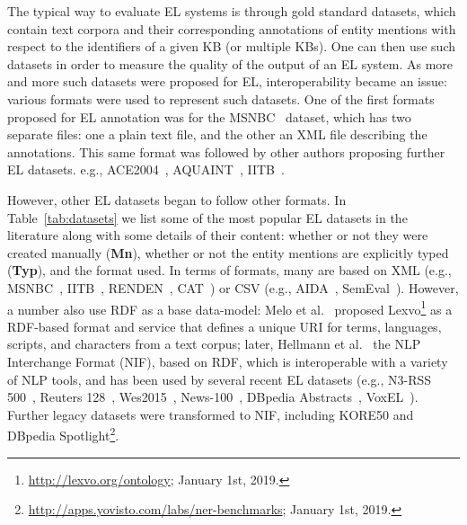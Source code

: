 \documentclass[sigconf]{acmart}
\begin{document}
The typical way to evaluate EL systems is through gold standard datasets, which contain text corpora and their corresponding annotations of entity mentions with respect to the identifiers of a given KB (or multiple KBs). One can then use such datasets in order to measure the quality of the output of an EL system. As more and more such datasets were proposed for EL, interoperability became an issue: various formats were used to represent such datasets. One of the first formats proposed for EL annotation was for the MSNBC~\cite{cucerzan2007large} dataset, which has two separate files: one a plain text file, and the other an XML file describing the annotations. This same format was followed by other authors proposing further EL datasets. e.g., ACE2004~\cite{aquaint}, AQUAINT~\cite{aquaint}, IITB~\cite{IITB2009}.

However, other EL datasets began to follow other formats. In Table~\ref{tab:datasets} we list some of the most popular EL datasets in the literature along with some details of their content: whether or not they were created manually (\textbf{Mn}), whether or not the entity mentions are explicitly typed (\textbf{Typ}), and the format used. In terms of formats, many are based on XML (e.g., MSNBC~\cite{cucerzan2007large}, IITB~\cite{IITB2009}, RENDEN~\cite{renden2016}, CAT~\cite{meantime2016}) or CSV (e.g., AIDA~\cite{aida2011}, SemEval~\cite{moro2015semeval}). However, a number also use RDF as a base data-model: Melo et al.~\cite{Lexvo2008} proposed Lexvo\footnote{\url{http://lexvo.org/ontology}; January 1st, 2019.} as a RDF-based format and service that defines a unique URI for terms, languages, scripts, and characters from a text corpus; %
later, Hellmann et al.~\cite{NIFpaper} the NLP Interchange Format (NIF), based on RDF, which is interoperable with a variety of NLP tools, and has been used by several recent EL datasets (e.g., N3-RSS 500~\cite{N3}, Reuters 128~\cite{N3}, Wes2015~\cite{wes2015}, News-100~\cite{N3}, DBpedia Abstracts~\cite{abstracts2016}, VoxEL~\cite{VoxEL2018}). Further legacy datasets were transformed to NIF, including KORE50 and DBpedia Spotlight\footnote{\url{http://apps.yovisto.com/labs/ner-benchmarks}; January 1st, 2019.}.
\end{document}

